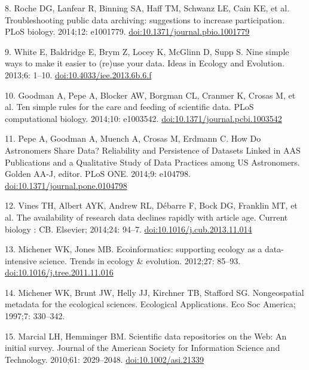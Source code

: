 \documentclass[10pt,letterpaper]{article}
\begin{document}
8. Roche DG, Lanfear R, Binning SA, Haff TM, Schwanz LE, Cain KE, et al.
Troubleshooting public data archiving: suggestions to increase
participation. PLoS biology. 2014;12: e1001779.
\href{http://doi.org/10.1371/journal.pbio.1001779}{doi:10.1371/journal.pbio.1001779}

9. White E, Baldridge E, Brym Z, Locey K, McGlinn D, Supp S. Nine simple
ways to make it easier to (re)use your data. Ideas in Ecology and
Evolution. 2013;6: 1--10.
\href{http://doi.org/10.4033/iee.2013.6b.6.f}{doi:10.4033/iee.2013.6b.6.f}

10. Goodman A, Pepe A, Blocker AW, Borgman CL, Cranmer K, Crosas M, et
al. Ten simple rules for the care and feeding of scientific data. PLoS
computational biology. 2014;10: e1003542.
\href{http://doi.org/10.1371/journal.pcbi.1003542}{doi:10.1371/journal.pcbi.1003542}

11. Pepe A, Goodman A, Muench A, Crosas M, Erdmann C. How Do Astronomers
Share Data? Reliability and Persistence of Datasets Linked in AAS
Publications and a Qualitative Study of Data Practices among US
Astronomers. Golden AA-J, editor. PLoS ONE. 2014;9: e104798.
\href{http://doi.org/10.1371/journal.pone.0104798}{doi:10.1371/journal.pone.0104798}

12. Vines TH, Albert AYK, Andrew RL, Débarre F, Bock DG, Franklin MT, et
al. The availability of research data declines rapidly with article age.
Current biology : CB. Elsevier; 2014;24: 94--7.
\href{http://doi.org/10.1016/j.cub.2013.11.014}{doi:10.1016/j.cub.2013.11.014}

13. Michener WK, Jones MB. Ecoinformatics: supporting ecology as a
data-intensive science. Trends in ecology \& evolution. 2012;27: 85--93.
\href{http://doi.org/10.1016/j.tree.2011.11.016}{doi:10.1016/j.tree.2011.11.016}

14. Michener WK, Brunt JW, Helly JJ, Kirchner TB, Stafford SG.
Nongeospatial metadata for the ecological sciences. Ecological
Applications. Eco Soc America; 1997;7: 330--342.

15. Marcial LH, Hemminger BM. Scientific data repositories on the Web:
An initial survey. Journal of the American Society for Information
Science and Technology. 2010;61: 2029--2048.
\href{http://doi.org/10.1002/asi.21339}{doi:10.1002/asi.21339}
\end{document}

